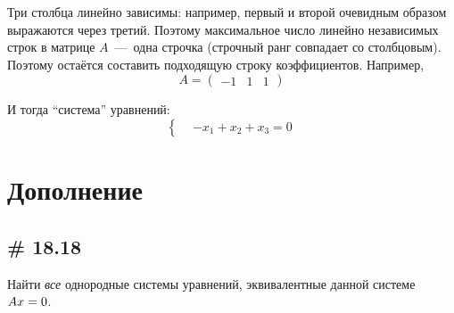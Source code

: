 \documentclass[a4paper,12pt]{article}
\begin{document}
\begin{solution}
    Три столбца линейно зависимы: например, первый и второй очевидным образом выражаются через третий.
    Поэтому максимальное число линейно независимых строк в матрице $A$~---~одна строчка (строчный ранг совпадает со столбцовым).
    Поэтому остаётся составить подходящую строку коэффициентов.
    Например,
    \[
      A = \begin{pmatrix}
        -1 & 1 & 1
      \end{pmatrix}
    \]
    
    И тогда ``система'' уравнений:
    \[
      \left\{
        \begin{aligned}
          &-x_1 + x_2 + x_3 = 0
        \end{aligned}
      \right.
    \]
  \end{solution}
  
  
  \section{Дополнение}
  \subsection{\# 18.18}
  \label{sec:18-18}
  
  Найти \emph{все} однородные системы уравнений, эквивалентные данной системе $Ax \hm= 0$.
  
\end{document}
